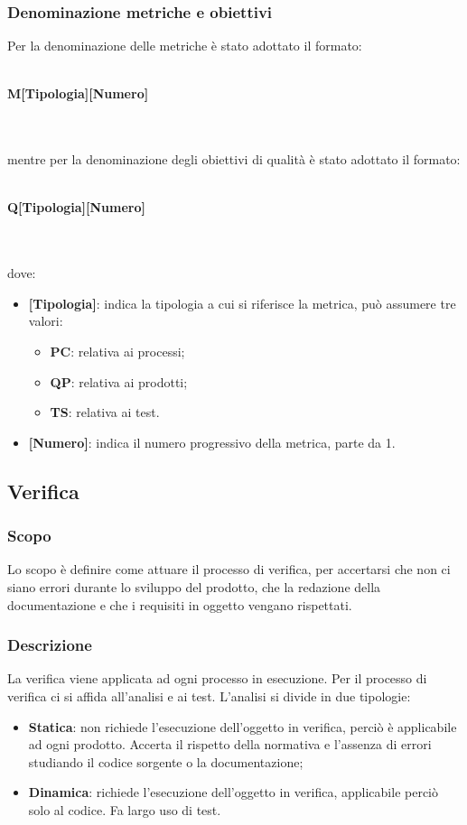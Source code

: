\subsubsection{Denominazione metriche e obiettivi}
Per la denominazione delle metriche è stato adottato il formato: \\ \\
\centerline{\textbf{M[Tipologia][Numero]}} \\ \\
mentre per la denominazione degli obiettivi di qualità è stato adottato il formato: \\ \\
\centerline{\textbf{Q[Tipologia][Numero]}} \\ \\
dove:
\begin{itemize}
\item \textbf{[Tipologia]}: indica la tipologia a cui si riferisce la metrica, può assumere tre valori:
    \begin{itemize}
    \item \textbf{PC}: relativa ai processi; 
    \item \textbf{QP}: relativa ai prodotti;
    \item \textbf{TS}: relativa ai test.
    \end{itemize}
\item \textbf{[Numero]}: indica il numero progressivo della metrica, parte da 1.
\end{itemize}	

\subsection{Verifica}
\subsubsection{Scopo}
Lo scopo è definire come attuare il processo di verifica, per accertarsi che non ci siano errori durante lo sviluppo del prodotto, che la redazione della documentazione e che i requisiti in oggetto vengano rispettati. 

\subsubsection{Descrizione}
La verifica viene applicata ad ogni processo in esecuzione. Per il processo di verifica ci si affida all'analisi e ai test. L'analisi si divide in due tipologie:
\begin{itemize}
\item \textbf{Statica}: non richiede l'esecuzione dell'oggetto in verifica, perciò è applicabile ad ogni prodotto. Accerta il rispetto della normativa e l'assenza di errori studiando il codice sorgente o la documentazione;
\item \textbf{Dinamica}: richiede l'esecuzione dell'oggetto in verifica, applicabile perciò solo al codice. Fa largo uso di test.
\end{itemize}

